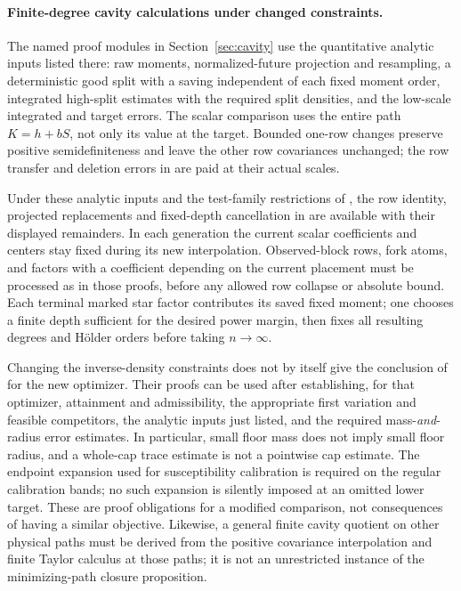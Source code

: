 \paragraph{Finite-degree cavity calculations under changed constraints.}
The named proof modules in Section~\ref{sec:cavity} use the quantitative
analytic inputs listed there: raw moments, normalized-future
projection and resampling, a deterministic good split with a saving
independent of each fixed moment order, integrated high-split
estimates with the required split densities, and the low-scale
integrated and target errors. The scalar comparison uses the entire
path $K=h+bS$, not only its value at the target. Bounded one-row changes
preserve positive semidefiniteness and leave the other row covariances
unchanged; the row transfer and deletion errors in
 are paid at their actual scales.

Under these analytic inputs and the test-family restrictions of
, the row identity, projected
replacements and fixed-depth cancellation in
are available with their displayed remainders. In each generation the
current scalar coefficients and centers stay fixed during its new
interpolation. Observed-block rows, fork atoms, and factors with a
coefficient depending on the current placement must be processed as
in those proofs, before any allowed row collapse or absolute bound.
Each terminal marked star factor contributes its saved fixed moment;
one chooses a finite depth sufficient for the desired power margin,
then fixes all resulting degrees and H\"older orders before taking
$n\to\infty$.

Changing the inverse-density constraints does not by itself give the
conclusion of  for the
new optimizer. Their proofs can be used after establishing, for that
optimizer, attainment and admissibility, the appropriate first
variation and feasible competitors, the analytic inputs just listed,
and the required mass-\emph{and}-radius error estimates. In particular,
small floor mass does not imply small floor radius, and a whole-cap
trace estimate is not a pointwise cap estimate. The endpoint expansion
used for susceptibility calibration is required on the regular
calibration bands; no such expansion is silently imposed at an
omitted lower target. These are proof obligations for a modified
comparison, not consequences of having a similar objective.
Likewise, a general finite cavity quotient on other physical paths
must be derived from the positive covariance interpolation and finite
Taylor calculus at those paths; it is not an unrestricted instance of
the minimizing-path closure proposition.

